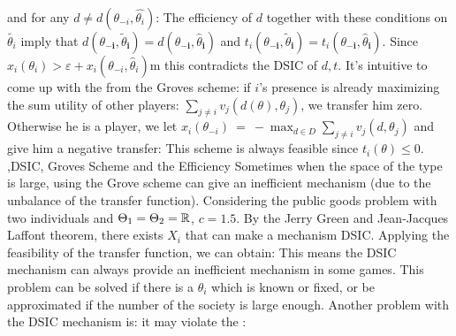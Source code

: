 \documentclass[10pt]{report}
\begin{document}
{{        
        and for any $d\ne d(\theta_{-i},\hat{\theta_i})$:
        The efficiency of $d$ together with these conditions on $\tilde{\theta_i}$ imply that $d(\theta_{-\boldsymbol{i}},\widetilde{\theta}_{\boldsymbol{i}})=d(\theta_{-\boldsymbol{i}},\widehat{\theta}_{\boldsymbol{i}})$ and $t_i(\theta_{-\boldsymbol{i}},\widetilde{\theta}_{\boldsymbol{i}})=t_i(\theta_{-\boldsymbol{i}},\widehat{\theta}_{\boldsymbol{i}})$.
        Since $x_i(\theta_i)>\varepsilon+x_i(\theta_{-i},\widehat{\theta}_i)$m this contradicts the DSIC of $d,t$.
    }
}
It's intuitive to come up with the  from the Groves scheme: if $i$'s presence is already maximizing the sum utility of other players: $\sum_{j\neq i}v_j(d(\theta),\theta_j)$, we transfer him zero. Otherwise he is a  player, we let $x_i(\theta_{-i})~=~-\max_{d\in D}\sum_{j\neq i}v_j(d,\theta_j)$ and give him a negative transfer:
This scheme is always feasible since $t_i(\theta)\le 0$. 
\sep{DSIC, Groves Scheme and the Efficiency}
Sometimes when the space of the type is large, using the Grove scheme can give an inefficient mechanism (due to the unbalance of the transfer function). Considering the public goods problem with two individuals and $\Theta_1=\Theta_2=\RR$, $c=1.5$. By the Jerry Green and Jean-Jacques Laffont theorem, there exists $X_i$ that can make a mechanism DSIC. Applying the feasibility of the transfer function, we can obtain: 
This means the DSIC mechanism can always provide an inefficient mechanism in some games. This problem can be solved if there is a $\theta_i$ which is known or fixed, or be approximated if the number of the society is large enough. Another problem with the DSIC mechanism is: it may violate the :
\end{document}
